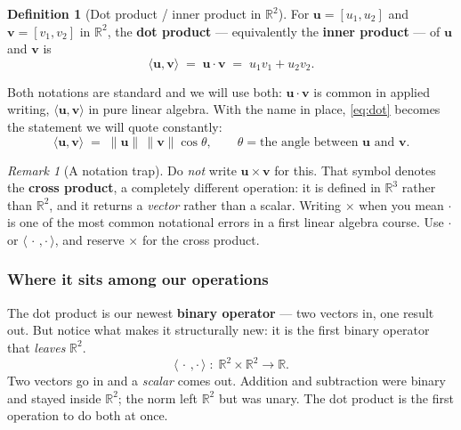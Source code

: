 \documentclass[11pt]{article}
\theoremstyle{definition}
\newtheorem{defn}{Definition}
\theoremstyle{remark}
\newtheorem*{rmk}{Remark}
\newcommand{\R}{\mathbb{R}}
\newcommand{\vc}[1]{\mathbf{#1}}
\newcommand{\norm}[1]{\lVert #1\rVert}
\begin{document}
\begin{defn}[Dot product / inner product in $\R^2$]
For $\vc{u}=[u_1,u_2]$ and $\vc{v}=[v_1,v_2]$ in $\R^{2}$, the
\textbf{dot product} --- equivalently the \textbf{inner product} --- of $\vc{u}$
and $\vc{v}$ is
\[
  \langle \vc{u},\vc{v}\rangle
  \;=\; \vc{u}\cdot\vc{v}
  \;=\; u_1v_1+u_2v_2 .
\]
\end{defn}

\noindent Both notations are standard and we will use both: $\vc{u}\cdot\vc{v}$
is common in applied writing, $\langle\vc{u},\vc{v}\rangle$ in pure linear
algebra. With the name in place, \eqref{eq:dot} becomes the statement we will
quote constantly:
\[
  \langle \vc{u},\vc{v}\rangle \;=\; \norm{\vc{u}}\,\norm{\vc{v}}\cos\theta ,
  \qquad \theta = \text{the angle between } \vc{u} \text{ and } \vc{v}.
\]

\begin{rmk}[A notation trap]
Do \emph{not} write $\vc{u}\times\vc{v}$ for this. That symbol denotes the
\textbf{cross product}, a completely different operation: it is defined in
$\R^{3}$ rather than $\R^{2}$, and it returns a \emph{vector} rather than a
scalar. Writing $\times$ when you mean $\cdot$ is one of the most common
notational errors in a first linear algebra course. Use $\cdot$ or
$\langle\,\cdot\,,\cdot\,\rangle$, and reserve $\times$ for the cross product.
\end{rmk}

\subsubsection*{Where it sits among our operations}
The dot product is our newest \textbf{binary operator} --- two vectors in, one
result out. But notice what makes it structurally new: it is the first binary
operator that \emph{leaves} $\R^{2}$.
\[
  \langle\,\cdot\,,\cdot\,\rangle\;:\;\R^{2}\times\R^{2}\to\R .
\]
Two vectors go in and a \emph{scalar} comes out. Addition and subtraction were
binary and stayed inside $\R^{2}$; the norm left $\R^{2}$ but was unary. The dot
product is the first operation to do both at once.
\end{document}
